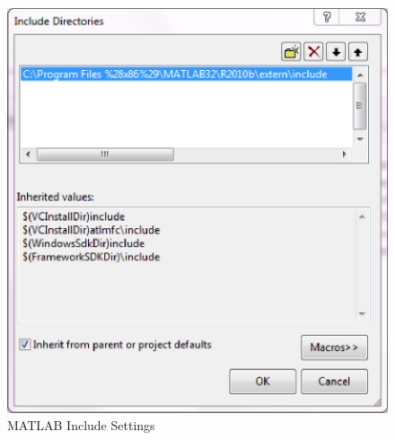 \documentclass[letterpaper,10pt]{article}%
\begin{document}
\begin{figure}
\centering
\includegraphics[scale = 0.6]{SettingIncludeFolder.eps}
\caption{MATLAB Include Settings}
\label{fig:SettingIncludeFolder}
\end{figure}
\end{document}
